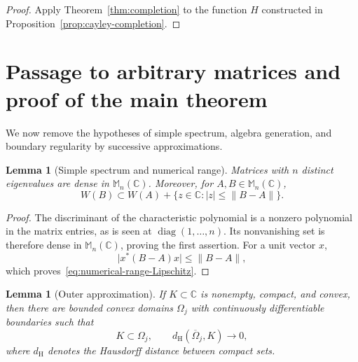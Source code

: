 \documentclass{aomart}
\newtheorem{lemma}[theorem]{Lemma}
\theoremstyle{definition}
\newcommand{\C}{\mathbb C}
\newcommand{\Mn}{\mathbb M_n(\C)}
\newcommand{\diag}{\operatorname{diag}}
\begin{document}
\begin{proof}
Apply Theorem~\ref{thm:completion} to the function $H$ constructed in
Proposition~\ref{prop:cayley-completion}.
\end{proof}

\section{Passage to arbitrary matrices and proof of the main theorem}
\label{sec:passage}

We now remove the hypotheses of simple spectrum, algebra generation,
and boundary regularity by successive approximations.

\begin{lemma}[Simple spectrum and numerical range]
\label{lem:simple-spectrum-density}
Matrices with $n$ distinct eigenvalues are dense in $\Mn$.  Moreover,
for $A,B\in\Mn$,
\begin{equation}
  W(B)\subset
  W(A)+\{z\in\C:\lvert z\rvert\leq\lVert B-A\rVert\}.
  \label{eq:numerical-range-Lipschitz}
\end{equation}
\end{lemma}

\begin{proof}
The discriminant of the characteristic polynomial is a nonzero
polynomial in the matrix entries, as is seen at
$\diag(1,\ldots,n)$.  Its nonvanishing set is therefore dense in
$\Mn$, proving the first assertion.  For a unit vector $x$,
\[
  \lvert x^*(B-A)x\rvert\leq\lVert B-A\rVert,
\]
which proves~\eqref{eq:numerical-range-Lipschitz}.
\end{proof}

\begin{lemma}[Outer approximation]
\label{lem:smooth-outer-approximation}
If $K\subset\C$ is nonempty, compact, and convex, then there are
bounded convex domains $\Omega_j$ with continuously differentiable
boundaries such that
\begin{equation}
  K\subset\Omega_j,
  \qquad
  d_{\mathrm H}(\overline\Omega_j,K)\longrightarrow0,
  \label{eq:outer-Hausdorff}
\end{equation}
where $d_{\mathrm H}$ denotes the Hausdorff distance between compact
sets.
\end{lemma}
\end{document}

